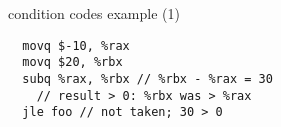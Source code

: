 \begin{frame}[fragile,label=ccEx1]{condition codes example (1)}
\begin{lstlisting}
  movq $-10, %rax
  movq $20, %rbx
  subq %rax, %rbx // %rbx - %rax = 30
    // result > 0: %rbx was > %rax
  jle foo // not taken; 30 > 0
\end{lstlisting}
\end{frame}

